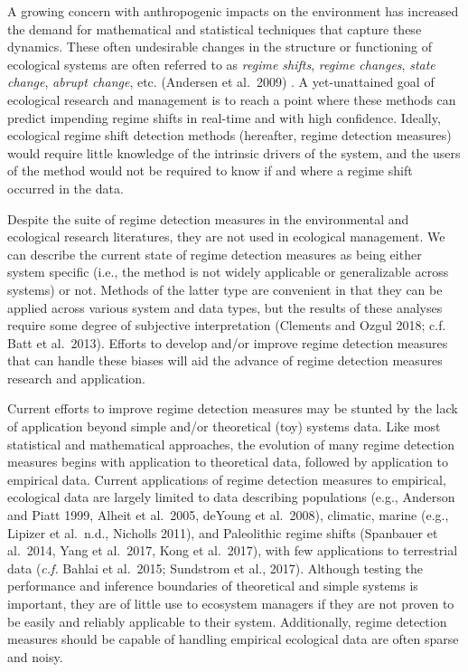\documentclass[12pt,twoside,openany]{reedthesis}
\begin{document}
A growing concern with anthropogenic impacts on the environment has increased the demand for mathematical and statistical techniques that capture these dynamics. These often undesirable changes in the structure or functioning of ecological systems are often referred to as \emph{regime shifts}, \emph{regime changes}, \emph{state change}, \emph{abrupt change}, etc. (Andersen et al.~2009) . A yet-unattained goal of ecological research and management is to reach a point where these methods can predict impending regime shifts in real-time and with high confidence. Ideally, ecological regime shift detection methods (hereafter, regime detection measures) would require little knowledge of the intrinsic drivers of the system, and the users of the method would not be required to know if and where a regime shift occurred in the data.

Despite the suite of regime detection measures in the environmental and ecological research literatures, they are not used in ecological management. We can describe the current state of regime detection measures as being either system specific (i.e., the method is not widely applicable or generalizable across systems) or not. Methods of the latter type are convenient in that they can be applied across various system and data types, but the results of these analyses require some degree of subjective interpretation (Clements and Ozgul 2018; c.f. Batt et al.~2013). Efforts to develop and/or improve regime detection measures that can handle these biases will aid the advance of regime detection measures research and application.

Current efforts to improve regime detection measures may be stunted by the lack of application beyond simple and/or theoretical (toy) systems data. Like most statistical and mathematical approaches, the evolution of many regime detection measures begins with application to theoretical data, followed by application to empirical data. Current applications of regime detection measures to empirical, ecological data are largely limited to data describing populations (e.g., Anderson and Piatt 1999, Alheit et al.~2005, deYoung et al.~2008), climatic, marine (e.g., Lipizer et al.~n.d., Nicholls 2011), and Paleolithic regime shifts (Spanbauer et al.~2014, Yang et al.~2017, Kong et al.~2017), with few applications to terrestrial data (\emph{c.f.} Bahlai et al.~2015; Sundstrom et al., 2017). Although testing the performance and inference boundaries of theoretical and simple systems is important, they are of little use to ecosystem managers if they are not proven to be easily and reliably applicable to their system. Additionally, regime detection measures should be capable of handling empirical ecological data are often sparse and noisy.
\end{document}
